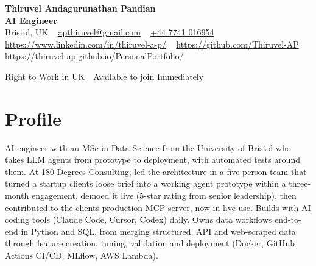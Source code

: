 \documentclass[a4paper,11pt]{article}
\begin{document}
\begin{center}
  {\LARGE\bfseries Thiruvel Andagurunathan Pandian} \\[3pt]
  {\color{headernavy}\small\textbf{AI Engineer}} \\[3pt]
  {\small
  Bristol, UK\nobreak\ \,\textbar\, \href{mailto:apthiruvel@gmail.com}{apthiruvel@gmail.com}\nobreak\ \,\textbar\, \href{tel:+447741016954}{+44 7741 016954}\nobreak\ \,\textbar\, \href{https://www.linkedin.com/in/thiruvel-a-p/}{https://www.linkedin.com/in/thiruvel-a-p/}\nobreak\ \,\textbar\, \href{https://github.com/Thiruvel-AP}{https://github.com/Thiruvel-AP}\nobreak\ \,\textbar\, \href{https://thiruvel-ap.github.io/PersonalPortfolio/}{https://thiruvel-ap.github.io/PersonalPortfolio/}}\par\vspace{4pt}
  \noindent{} Right to Work in UK \,\textbar\, Available to join Immediately
\end{center}

\section{Profile}
AI engineer with an MSc in Data Science from the University of Bristol who takes LLM agents from prototype to deployment, with automated tests around them. At 180 Degrees Consulting, led the architecture in a five-person team that turned a startup client\textquotesingle{}s loose brief into a working agent prototype within a three-month engagement, demoed it live (5-star rating from senior leadership), then contributed to the client\textquotesingle{}s production MCP server, now in live use. Builds with AI coding tools (Claude Code, Cursor, Codex) daily. Owns data workflows end-to-end in Python and SQL, from merging structured, API and web-scraped data through feature creation, tuning, validation and deployment (Docker, GitHub Actions CI/CD, MLflow, AWS Lambda).
\end{document}
